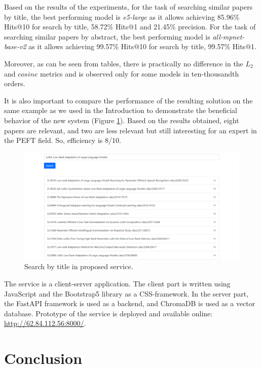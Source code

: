 \documentclass{article}
\begin{document}
        
    
        Based on the results of the experiments, for the task of searching similar papers by title, the best performing model is \textit{e5-large} as it allows achieving 85.96\% Hits@10 for search by title, 58.72\% Hits@1 and 21.45\% precision. For the task of searching similar papers by abstract, the best performing model is \textit{all-mpnet-base-v2} as it allows achieving 99.57\% Hits@10 for search by title, 99.57\% Hits@1.
    
        Moreover, as can be seen from tables, there is practically no difference in the \(L_{2}\) and \(cosine\) metrics and is observed only for some models in ten-thousandth orders.
    
        It is also important to compare the performance of the resulting solution on the same example as we used in the Introduction to demonstrate the beneficial behavior of the new system (Figure \ref{fig:aziri-search}). Based on the results obtained, eight papers are relevant, and two are less relevant but still interesting for an expert in the PEFT field. So, efficiency is 8/10.
    
        \begin{figure}[H]
            \centering
            \includegraphics[width=0.7\linewidth]{img/search_aziri.png}
            \caption{Search by title in proposed service.}
            \label{fig:aziri-search}
        \end{figure}
    
        The service is a client-server application. The client part is written using JavaScript and the Bootstrap5 library as a CSS-framework. In the server part, the FastAPI framework is used as a backend, and ChromaDB is used as a vector database. Prototype of the service is deployed and available online: \url{http://62.84.112.56:8000/}.
        
    
    \section{Conclusion}
    
\end{document}
